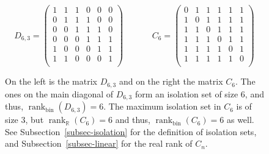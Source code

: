 \documentclass[11pt]{article}
\newcommand{\rank}{\mathop{\mathrm{rank}}}
\newcommand{\Rbin}{{\rank}_{\mathrm{bin}}}
\newcommand{\Rreal}{{\rank}_\mathbb{R}}
\begin{document}
\begin{figure}[htb!]
$$
D_{6,3} = \left(
  \begin{array}{cccccc}
    1 & 1 & 1 & 0 & 0 & 0  \\
    0 & 1 & 1 & 1 & 0 & 0  \\
    0 & 0 & 1 & 1 & 1 & 0 \\
    0 & 0 & 0 & 1 & 1 & 1  \\
    1 & 0 & 0 & 0 & 1 & 1 \\
    1 & 1 & 0 & 0 & 0 & 1 \\
   \end{array}
\right)
\;\;\;\;\;\;\;\;\;\;\;\;
C_{6} = \left(
  \begin{array}{cccccc}
    0 & 1 & 1 & 1 & 1 & 1  \\
    1 & 0 & 1 & 1 & 1 & 1  \\
    1 & 1 & 0 & 1 & 1 & 1  \\
    1 & 1 & 1 & 0 & 1 & 1  \\
    1 & 1 & 1 & 1 & 0 & 1  \\
    1 & 1 & 1 & 1 & 1 & 0  \\
   \end{array}
\right)
$$
\caption{On the left is the matrix $D_{6,3}$ and on the right the matrix $C_6$.
The ones on the main diagonal of $D_{6,3}$ form an isolation set of size $6$, and thus, $\Rbin(D_{6,3}) = 6$.
The maximum isolation set in $C_6$ is of size $3$, but $\Rreal(C_6) = 6$ and thus, $\Rbin(C_6) = 6$ as well.
See Subsection~\ref{subsec-isolation} for the definition of isolation sets,
and Subsection~\ref{subsec-linear} for the real rank of $C_n$.}
\label{fig:D84}	
\end{figure}
\end{document}
